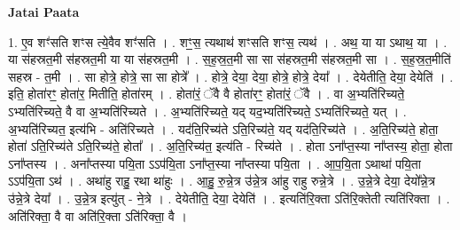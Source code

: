 \documentclass[17pt]{extarticle}
\begin{document}
\textbf{Jatai Paata} \newline

1. ए॒व शꣳ॑सति शꣳस त्ये॒वैव शꣳ॑सति । . शꣳ॒॒स॒ त्यथाथ॑ शꣳसति शꣳस॒ त्यथ॑ । . अथ॒ या या ऽथाथ॒ या । . या स॑हस्रत॒मी स॑हस्रत॒मी या या स॑हस्रत॒मी । . स॒ह॒स्र॒त॒मी सा सा स॑हस्रत॒मी स॑हस्रत॒मी सा । . स॒ह॒स्र॒त॒मीति॑ सहस्र - त॒मी । . सा होत्रे॒ होत्रे॒ सा सा होत्रे᳚ । . होत्रे॒ देया॒ देया॒ होत्रे॒ होत्रे॒ देया᳚ । . देयेतीति॒ देया॒ देयेति॑ । . इति॒ होता॑रꣳ॒॒ होता॑र॒ मितीति॒ होता॑रम् । . होता॑रं॒ ॅवै वै होता॑रꣳ॒॒ होता॑रं॒ ॅवै । . वा अ॒भ्यति॑रिच्यते॒ ऽभ्यति॑रिच्यते॒ वै वा अ॒भ्यति॑रिच्यते । . अ॒भ्यति॑रिच्यते॒ यद् यद॒भ्यति॑रिच्यते॒ ऽभ्यति॑रिच्यते॒ यत् । . अ॒भ्यति॑रिच्यत॒ इत्य॑भि - अति॑रिच्यते । . यद॑ति॒रिच्य॑ते ऽति॒रिच्य॑ते॒ यद् यद॑ति॒रिच्य॑ते । . अ॒ति॒रिच्य॑ते॒ होता॒ होता॑ ऽति॒रिच्य॑ते ऽति॒रिच्य॑ते॒ होता᳚ । . अ॒ति॒रिच्य॑त॒ इत्य॑ति - रिच्य॑ते । . होता ऽना᳚प्त॒स्या ना᳚प्तस्य॒ होता॒ होता ऽना᳚प्तस्य । . अना᳚प्तस्या पयि॒ता ऽऽप॑यि॒ता ऽना᳚प्त॒स्या ना᳚प्तस्या पयि॒ता । . आ॒प॒यि॒ता ऽथाथा॑ पयि॒ता ऽऽप॑यि॒ता ऽथ॑ । . अथा॑हु राहु॒ रथा था॑हुः । . आ॒हु॒ रु॒न्ने॒त्र उ॑न्ने॒त्र आ॑हु राहु रुन्ने॒त्रे । . उ॒न्ने॒त्रे देया॒ देयो᳚न्ने॒त्र उ॑न्ने॒त्रे देया᳚ । . उ॒न्ने॒त्र इत्यु॑त् - ने॒त्रे । . देयेतीति॒ देया॒ देयेति॑ । . इत्यति॑रि॒क्ता ऽति॑रि॒क्तेती त्यति॑रिक्ता । . अति॑रिक्ता॒ वै वा अति॑रि॒क्ता ऽति॑रिक्ता॒ वै । \newline
\end{document}
